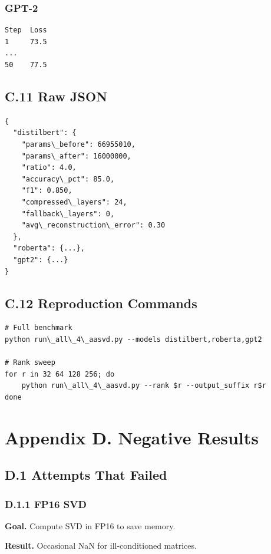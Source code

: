 \subsubsection{GPT-2}
\begin{lstlisting}
Step  Loss
1     73.5
...
50    77.5
\end{lstlisting}

\subsection{C.11 Raw JSON}

\begin{lstlisting}
{
  "distilbert": {
    "params\_before": 66955010,
    "params\_after": 16000000,
    "ratio": 4.0,
    "accuracy\_pct": 85.0,
    "f1": 0.850,
    "compressed\_layers": 24,
    "fallback\_layers": 0,
    "avg\_reconstruction\_error": 0.30
  },
  "roberta": {...},
  "gpt2": {...}
}
\end{lstlisting}

\subsection{C.12 Reproduction Commands}

\begin{lstlisting}
# Full benchmark
python run\_all\_4\_aasvd.py --models distilbert,roberta,gpt2

# Rank sweep
for r in 32 64 128 256; do
    python run\_all\_4\_aasvd.py --rank $r --output_suffix r$r
done
\end{lstlisting}


\section{Appendix D. Negative Results}

\subsection{D.1 Attempts That Failed}

\subsubsection{D.1.1 FP16 SVD}

\textbf{Goal.} Compute SVD in FP16 to save memory.

\textbf{Result.} Occasional NaN for ill-conditioned matrices.

